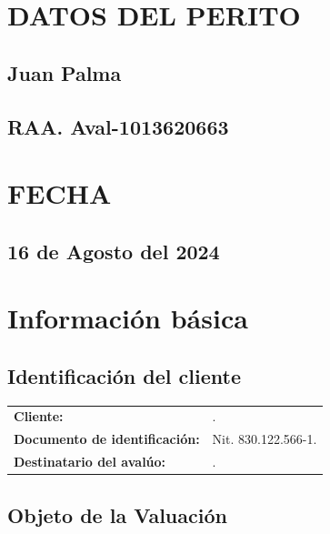 \documentclass[12pt,a4paper,twoside]{article}
\begin{document}
\bigskip 
\bigskip 
\bigskip 
\bigskip 
\bigskip 
\bigskip 

\section*{DATOS DEL PERITO}

\subsection*{Juan Palma}
\subsection*{RAA. Aval-1013620663}

\bigskip 
\bigskip 
\bigskip 
\bigskip 
\bigskip 
\bigskip 

\section*{FECHA}

\subsection*{16 de Agosto del 2024}
	


\clearpage

\tableofcontents

\clearpage


\section{Información básica}

\subsection{Identificación del cliente}

\begin{tabular}{ l p{7.5cm} }
	
	\textbf{Cliente:} & \Propietarios. \\
	\textbf{Documento de identificación:} & Nit. 830.122.566-1.\\
	\textbf{Destinatario del avalúo:} & \Propietarios. \\
	
\end{tabular}


\subsection{Objeto de la Valuación}
\end{document}
